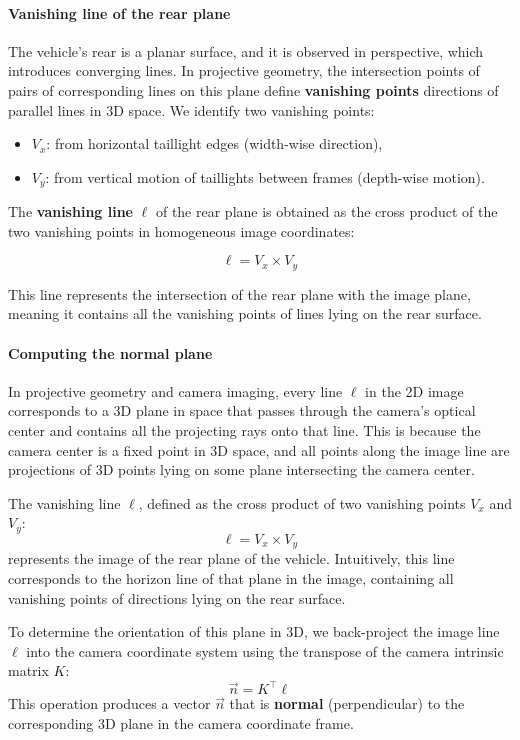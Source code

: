 \paragraph{Vanishing line of the rear plane}
The vehicle’s rear is a planar surface, and it is observed in perspective, which introduces converging lines. In projective geometry, the intersection points of pairs of corresponding lines on this plane define \textbf{vanishing points} directions of parallel lines in 3D space. We identify two vanishing points:

\begin{itemize}
\item \( V_x \): from horizontal taillight edges (width-wise direction),
\item \( V_y \): from vertical motion of taillights between frames (depth-wise motion).
\end{itemize}

The \textbf{vanishing line} \( \ell \) of the rear plane is obtained as the cross product of the two vanishing points in homogeneous image coordinates:

\[
\ell = V_x \times V_y
\]

This line represents the intersection of the rear plane with the image plane, meaning it contains all the vanishing points of lines lying on the rear surface.

\paragraph{Computing the normal plane}
In projective geometry and camera imaging, every line \( \ell \) in the 2D image corresponds to a 3D plane in space that passes through the camera’s optical center and contains all the projecting rays onto that line. This is because the camera center is a fixed point in 3D space, and all points along the image line are projections of 3D points lying on some plane intersecting the camera center.

The vanishing line \( \ell \), defined as the cross product of two vanishing points \( V_x \) and \( V_y \):
\[
\ell = V_x \times V_y
\]
represents the image of the rear plane of the vehicle. Intuitively, this line corresponds to the horizon line of that plane in the image, containing all vanishing points of directions lying on the rear surface.

To determine the orientation of this plane in 3D, we back-project the image line \( \ell \) into the camera coordinate system using the transpose of the camera intrinsic matrix \( K \):
\[
\vec{n} = K^\top \ell
\]
This operation produces a vector \( \vec{n} \) that is \textbf{normal} (perpendicular) to the corresponding 3D plane in the camera coordinate frame.

